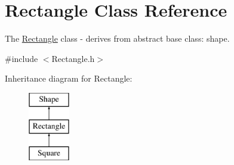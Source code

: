 \hypertarget{class_rectangle}{}\section{Rectangle Class Reference}
\label{class_rectangle}


The \hyperlink{class_rectangle}{Rectangle} class -\/ derives from abstract base class\+: shape.  




{\ttfamily \#include $<$Rectangle.\+h$>$}

Inheritance diagram for Rectangle\+:\begin{figure}[H]
\begin{center}
\leavevmode
\includegraphics[height=3.000000cm]{class_rectangle}
\end{center}
\end{figure}
